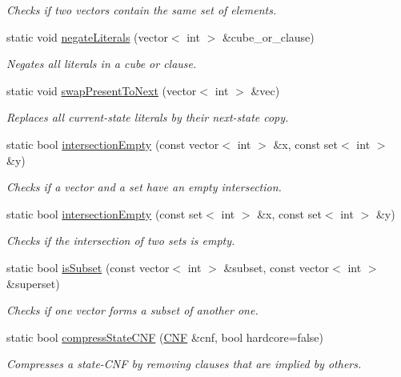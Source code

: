 \begin{DoxyCompactItemize}
\begin{DoxyCompactList}\small\item\em Checks if two vectors contain the same set of elements. \end{DoxyCompactList}\item 
static void \hyperlink{classUtils_ae7584589e0d06005fe893fdb9244483a}{negate\-Literals} (vector$<$ int $>$ \&cube\-\_\-or\-\_\-clause)
\begin{DoxyCompactList}\small\item\em Negates all literals in a cube or clause. \end{DoxyCompactList}\item 
static void \hyperlink{classUtils_a8e0d236cf00a61a34ef5c48bcb08a1ec}{swap\-Present\-To\-Next} (vector$<$ int $>$ \&vec)
\begin{DoxyCompactList}\small\item\em Replaces all current-\/state literals by their next-\/state copy. \end{DoxyCompactList}\item 
static bool \hyperlink{classUtils_aa6a513b0ad3b22b3b857060219c222d6}{intersection\-Empty} (const vector$<$ int $>$ \&x, const set$<$ int $>$ \&y)
\begin{DoxyCompactList}\small\item\em Checks if a vector and a set have an empty intersection. \end{DoxyCompactList}\item 
static bool \hyperlink{classUtils_ae957d76f82e729f9d127cf05cb61320d}{intersection\-Empty} (const set$<$ int $>$ \&x, const set$<$ int $>$ \&y)
\begin{DoxyCompactList}\small\item\em Checks if the intersection of two sets is empty. \end{DoxyCompactList}\item 
static bool \hyperlink{classUtils_ab5dca8125b6addaa1f0331664ab6142e}{is\-Subset} (const vector$<$ int $>$ \&subset, const vector$<$ int $>$ \&superset)
\begin{DoxyCompactList}\small\item\em Checks if one vector forms a subset of another one. \end{DoxyCompactList}\item 
static bool \hyperlink{classUtils_ac4e713aa386834b587e2695855fbc27a}{compress\-State\-C\-N\-F} (\hyperlink{classCNF}{C\-N\-F} \&cnf, bool hardcore=false)
\begin{DoxyCompactList}\small\item\em Compresses a state-\/\-C\-N\-F by removing clauses that are implied by others. \end{DoxyCompactList}\item 

\end{DoxyCompactItemize}

